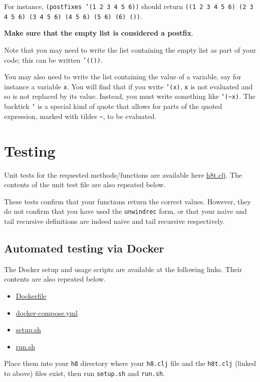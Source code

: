 \documentclass[11pt]{article}
\begin{document}
For instance, \texttt{(postfixes '(1 2 3 4 5 6))} should
return \texttt{((1 2 3 4 5 6) (2 3 4 5 6) (3 4 5 6) (4 5 6) (5 6) (6) ())}.

\textbf{Make sure that the empty list is considered a postfix}.

Note that you may need to write the list containing the empty list
as part of your code; this can be written \texttt{'(())}.

You may also need to write the list containing the value of a variable,
say for instance a variable \texttt{x}. You will find that
if you write \texttt{'(x)}, \texttt{x} is not evaluated and so is not replaced by its value.
Instead, you must write something like \texttt{`(\textasciitilde{}x)}. The backtick \texttt{`} is a special
kind of quote that allows for parts of the quoted expression,
marked with tildes \texttt{\textasciitilde{}}, to be evaluated.

\section*{Testing}
\label{sec:org9eb1ece}
Unit tests for the requested methods/functions
are available here \href{./testing/h8/h8t.clj}{h8t.clj}.
The contents of the unit test file are also repeated below.

\begin{center}
These tests confirm that your functions return the correct values.
However, they do not confirm that you have used the \texttt{unwindrec} form,
or that your naive and tail recursive definitions are indeed
naive and tail recursive respectively.
\end{center}

\subsection*{Automated testing via Docker}
\label{sec:orgf267c06}
The Docker setup and usage scripts are available at the following links.
Their contents are also repeated below.
\begin{itemize}
\item \href{./testing/h8/Dockerfile}{Dockerfile}
\item \href{./testing/h8/docker-compose.yml}{docker-compose.yml}
\item \href{./testing/h8/setup.sh}{setup.sh}
\item \href{./testing/h8/run.sh}{run.sh}
\end{itemize}
Place them into your \texttt{h8} directory where your \texttt{h8.clj} file
and the \texttt{h8t.clj} (linked to above) files exist,
then run \texttt{setup.sh} and \texttt{run.sh}.
\end{document}
